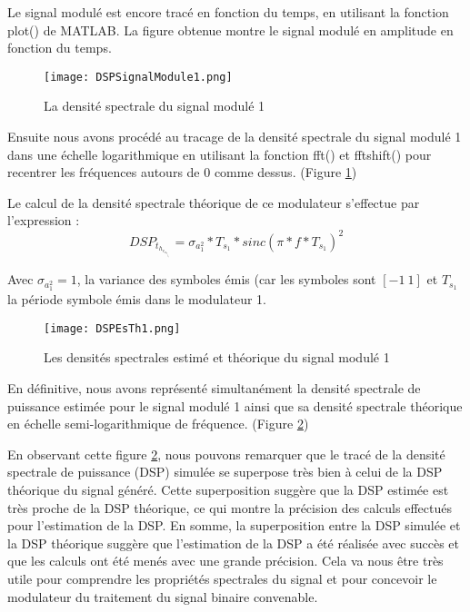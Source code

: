 \documentclass[11pt]{article}
\begin{document}
Le signal modulé est encore tracé en fonction du temps, en utilisant la fonction plot() de MATLAB. La figure obtenue montre le signal modulé en amplitude en fonction du temps.

\begin{figure}[ht!]
            \centering
            \texttt{[image: DSPSignalModule1.png]}
            \caption{La densité spectrale du signal modulé 1 \label{fig : DSPSignalModule1}}
        \end{figure}

Ensuite nous avons procédé au tracage de la densité spectrale du signal modulé 1 dans une échelle logarithmique en utilisant la fonction fft() et fftshift() pour recentrer les fréquences autours de 0 comme dessus. (Figure \ref{fig : DSPSignalModule1})

Le calcul de la densité spectrale théorique de ce modulateur s'effectue par l'expression :
$$ DSP_t_h_e_o_r_i_q_u_e_1 = \sigma_a_1^{2} * T_s_1 * sinc(\pi*f*T_s_1)^{2} $$

Avec $\sigma_a_1^{2} = 1$, la variance des symboles émis (car les symboles sont $[-1 \ 1]$ et $T_s_1$ la période symbole émis dans le modulateur 1.

\begin{figure}[ht!]
            \centering
            \texttt{[image: DSPEsTh1.png]}
            \caption{Les densités spectrales estimé et théorique du signal modulé 1 \label{fig : DSPEsThSignalModule1}}
        \end{figure}

En définitive, nous avons représenté simultanément la densité spectrale de puissance estimée pour le signal modulé 1 ainsi que sa densité spectrale théorique en échelle semi-logarithmique de fréquence. (Figure \ref{fig : DSPEsThSignalModule1})

En observant cette figure \ref{fig : DSPEsThSignalModule1}, nous pouvons remarquer que le tracé de la densité spectrale de puissance (DSP) simulée se superpose très bien à celui de la DSP théorique du signal généré. Cette superposition suggère que la DSP estimée est très proche de la DSP théorique, ce qui montre la précision des calculs effectués pour l'estimation de la DSP.
En somme, la superposition entre la DSP simulée et la DSP théorique suggère que l'estimation de la DSP a été réalisée avec succès et que les calculs ont été menés avec une grande précision. Cela va nous être très utile pour comprendre les propriétés spectrales du signal et pour concevoir le modulateur du traitement du signal binaire convenable.
\end{document}

